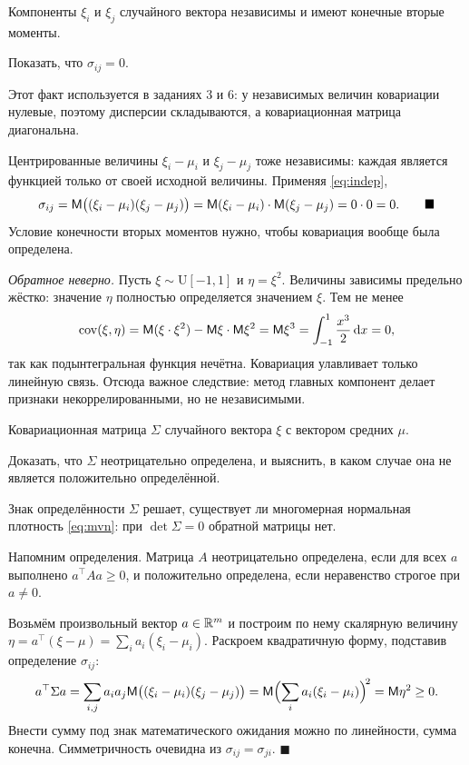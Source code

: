 \documentclass[12pt,a4paper]{article}
\begin{document}
\dano Компоненты $\xi_i$ и $\xi_j$ случайного вектора независимы и имеют
конечные вторые моменты.

\treb Показать, что $\sigma_{ij} = 0$.

\zachem Этот факт используется в заданиях 3 и 6: у независимых величин
ковариации нулевые, поэтому дисперсии складываются, а ковариационная матрица
диагональна.

\resh Центрированные величины $\xi_i - \mu_i$ и $\xi_j - \mu_j$ тоже независимы:
каждая является функцией только от своей исходной величины. Применяя
\eqref{eq:indep},
\[
  \sigma_{ij} = \mathsf{M}\bigl((\xi_i-\mu_i)(\xi_j-\mu_j)\bigr)
              = \mathsf{M}(\xi_i-\mu_i)\cdot\mathsf{M}(\xi_j-\mu_j)
              = 0\cdot 0 = 0 . \qquad\blacksquare
\]
Условие конечности вторых моментов нужно, чтобы ковариация вообще была
определена.

\smallskip
\emph{Обратное неверно.} Пусть $\xi \sim \mathrm{U}[-1,1]$ и $\eta = \xi^2$.
Величины зависимы предельно жёстко: значение $\eta$ полностью определяется
значением $\xi$. Тем не менее
\[
  \mathrm{cov}(\xi,\eta) = \mathsf{M}(\xi\cdot\xi^2) - \mathsf{M}\xi\cdot\mathsf{M}\xi^2
  = \mathsf{M}\xi^3 = \int_{-1}^{1}\frac{x^3}{2}\,\mathrm{d} x = 0,
\]
так как подынтегральная функция нечётна. Ковариация улавливает только линейную
связь. Отсюда важное следствие: метод главных компонент делает признаки
некоррелированными, но не независимыми.

\dano Ковариационная матрица $\Sigma$ случайного вектора $\xi$ с вектором
средних $\mu$.

\treb Доказать, что $\Sigma$ неотрицательно определена, и выяснить, в каком
случае она не является положительно определённой.

\zachem Знак определённости $\Sigma$ решает, существует ли многомерная нормальная
плотность \eqref{eq:mvn}: при $\det\Sigma = 0$ обратной матрицы нет.

\resh Напомним определения. Матрица $A$ неотрицательно определена, если для
всех $a$ выполнено $a^{\top}Aa \ge 0$, и положительно определена, если
неравенство строгое при $a \ne 0$.

Возьмём произвольный вектор $a \in \mathbb{R}^m$ и построим по нему скалярную величину
$\eta = a^{\top}(\xi - \mu) = \sum_i a_i(\xi_i - \mu_i)$. Раскроем квадратичную
форму, подставив определение $\sigma_{ij}$:
\[
  a^{\top}\Sigma a
  = \sum_{i,j} a_i a_j \mathsf{M}\bigl((\xi_i-\mu_i)(\xi_j-\mu_j)\bigr)
  = \mathsf{M}\Bigl(\sum_i a_i(\xi_i-\mu_i)\Bigr)^{\!2}
  = \mathsf{M}\eta^2 \ge 0 .
\]
Внести сумму под знак математического ожидания можно по линейности, сумма
конечна. Симметричность очевидна из $\sigma_{ij} = \sigma_{ji}$. $\blacksquare$
\end{document}
